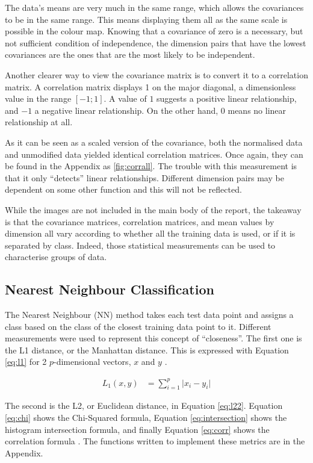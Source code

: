 \documentclass[a4paper, 10pt, conference]{ieeeconf}
\begin{document}
The data's means are very much in the same range, which allows the covariances to be in the same range. This means displaying them all as the same scale is possible in the colour map. Knowing that a covariance of zero is a necessary, but not sufficient condition of independence, the dimension pairs that have the lowest covariances are the ones that are the most likely to be independent.

Another clearer way to view the covariance matrix is to convert it to a correlation matrix. A correlation matrix displays 1 on the major diagonal, a dimensionless value in the range $[-1; 1]$. A value of $1$ suggests a positive linear relationship, and $-1$ a negative linear relationship. On the other hand, $0$ means no linear relationship at all.

As it can be seen as a scaled version of the covariance, both the normalised data and unmodified data yielded identical correlation matrices. Once again, they can be found in the Appendix as \ref{fig:corrall}. The trouble with this measurement is that it only ``detects'' linear relationships. Different dimension pairs may be dependent on some other function and this will not be reflected.

While the images are not included in the main body of the report, the takeaway is that the covariance matrices, correlation matrices, and mean values by dimension all vary according to whether all the training data is used, or if it is separated by class. Indeed, those statistical measurements can be used to characterise groups of data.

\subsection{Nearest Neighbour Classification}
The Nearest Neighbour (NN) method takes each test data point and assigns a class based on the class of the closest training data point to it. Different measurements were used to represent this concept of ``closeness''. The first one is the L1 distance, or the Manhattan distance. This is expressed with Equation \ref{eq:l1} for 2 $p$-dimensional vectors, $x$ and $y$ \cite{metrics}.

\begin{align}
  L_1 \left( x, y \right) &= \sum_{i = 1}^{p} \lvert x_i  - y_i \rvert \label{eq:l1}
\end{align}

The second is the L2, or Euclidean distance, in Equation \ref{eq:l22}. Equation \ref{eq:chi} shows the Chi-Squared formula, Equation \ref{eq:intersection} shows the histogram intersection formula, and finally Equation \ref{eq:corr} shows the correlation formula \cite{metrics}. The functions written to implement these metrics are in the Appendix.
\end{document}
